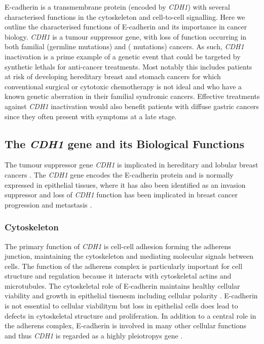 \gls{E-cadherin} is a transmembrane protein (encoded by \textit{CDH1}) with several characterised functions in the cytoskeleton and cell-to-cell signalling. Here we outline the characterised functions of \gls{E-cadherin} and its importance in cancer biology. \textit{CDH1} is a \gls{tumour suppressor} gene, with loss of function occurring in both \gls{familial} (\gls{germline} \glspl{mutation}) and  ( \glspl{mutation}) cancers. As such, \textit{CDH1} inactivation is a prime example of a genetic event that could be targeted by \glspl{synthetic lethal} for anti-cancer \glspl{treatment}. Most notably this includes patients at risk of developing \gls{hereditary} breast and stomach cancers for which conventional surgical or cytotoxic \gls{chemotherapy} is not ideal and who have a known genetic aberration in their \gls{familial} syndromic cancers. Effective \glspl{treatment} against \textit{CDH1} inactivation would also benefit patients with  diffuse gastric cancers since they often present with symptoms at a late stage.

\subsection{The \textit{CDH1} gene and its Biological Functions}
The \gls{tumour suppressor} gene \textit{CDH1} is implicated in \gls{hereditary} and  lobular breast cancers \citep{Berx1996,DeLeeuw1997,Berx2009,Vos1997,Semb1998,Masciari2007}. The \textit{CDH1} gene encodes the \gls{E-cadherin} protein and is normally expressed in epithelial tissues, where it has also been identified as an invasion suppressor and loss of \textit{CDH1} function has been implicated in breast cancer progression and metastasis \citep{Berx1995,Becker1994,Christofori1999}.

\subsubsection{Cytoskeleton}
The primary function of \textit{CDH1} is cell-cell adhesion forming the adherens junction, maintaining the cytoskeleton and mediating molecular signals between cells. The function of the adherens complex is particularly important for cell structure and regulation because it interacts with cytoskeletal actins and microtubules. The cytoskeletal role of \gls{E-cadherin} maintains healthy cellular viability and growth in epithelial tissuesm including cellular polarity \citep{Jeanes2008}. \gls{E-cadherin} is not \gls{essential} to cellular viabilitym but loss in epithelial cells does lead to defects in cytoskeletal structure and proliferation. In addition to a central role in the adherens complex, \gls{E-cadherin} is involved in many other cellular functions and thus \textit{CDH1} is regarded as a highly \glspl{pleiotropy} gene \citep{Kroepil2012}.

